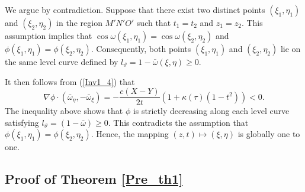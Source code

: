 \documentclass[3p,11pt]{elsarticle}
\numberwithin{equation}{section}
\begin{document}
We argue by contradiction. Suppose that there exist two distinct points $(\xi_{1},\eta_{1})$ and $(\xi_{2},\eta_{2})$ in the region $M'N'O'$ such that $t_{1}=t_{2}$ and $z_{1}=z_{2}$. This assumption implies that
$\cos\omega(\xi_{1},\eta_{1})=\cos\omega(\xi_{2},\eta_{2})$ and
$\phi(\xi_{1},\eta_{1})=\phi(\xi_{2},\eta_{2})$.
Consequently, both points $(\xi_{1},\eta_{1})$ and $(\xi_{2},\eta_{2})$ lie on the same level curve defined by
$l_{\vartheta}=1-\bar\omega(\xi,\eta)\ge 0$.

It then follows from (\ref{Inv1_4}) that
\begin{equation}\label{Inv1_8}
   \nabla\phi\cdot(\bar\omega_\eta, -\bar\omega_\xi) =-\frac{c({ X}-{ Y})}{2t}(1+\kappa(\tau)(1-t^2))<0.
\end{equation}
The inequality above shows that $\phi$ is strictly decreasing along each level curve satisfying $l_{\vartheta}=(1-\bar\omega)\ge 0$. This contradicts the assumption that $\phi(\xi_{1},\eta_{1})=\phi(\xi_{2},\eta_{2})$. Hence, the mapping $(z,t)\mapsto(\xi,\eta)$ is globally one to one.

\subsection{Proof of Theorem \ref{Pre_th1}}
\end{document}
